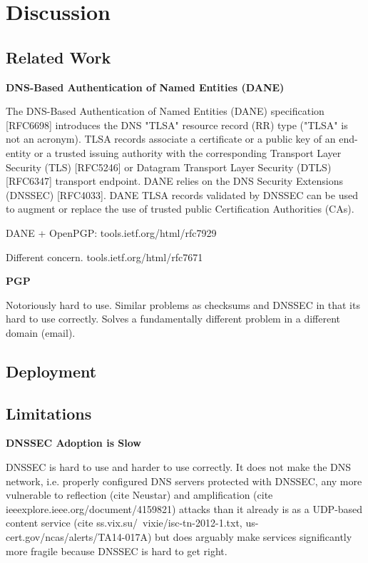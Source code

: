 \section{Discussion} \label{sec:discussion}

\subsection{Related Work}

\textbf{DNS-Based Authentication of Named Entities (DANE)}

The DNS-Based Authentication of Named Entities (DANE) specification [RFC6698]
introduces the DNS "TLSA" resource record (RR) type ("TLSA" is not an acronym).
TLSA records associate a certificate or a public key of an end-entity or a
trusted issuing authority with the corresponding Transport Layer Security (TLS)
[RFC5246] or Datagram Transport Layer Security (DTLS) [RFC6347] transport
endpoint. DANE relies on the DNS Security Extensions (DNSSEC) [RFC4033]. DANE
TLSA records validated by DNSSEC can be used to augment or replace the use of
trusted public Certification Authorities (CAs).

DANE + OpenPGP: tools.ietf.org/html/rfc7929

Different concern. tools.ietf.org/html/rfc7671

\textbf{PGP}

Notoriously hard to use. Similar problems as checksums and DNSSEC in that its
hard to use correctly. Solves a fundamentally different problem in a different
domain (email).

\subsection{Deployment}


\subsection{Limitations}

\textbf{DNSSEC Adoption is Slow}

DNSSEC is hard to use and harder to use correctly. It does not make the DNS
network, i.e. properly configured DNS servers protected with DNSSEC, any more
vulnerable to reflection (cite Neustar) and amplification (cite
ieeexplore.ieee.org/document/4159821) attacks than it already is as a UDP-based
content service (cite ss.vix.su/~vixie/isc-tn-2012-1.txt,
us-cert.gov/ncas/alerts/TA14-017A) but does arguably make services significantly
more fragile because DNSSEC is hard to get right.

